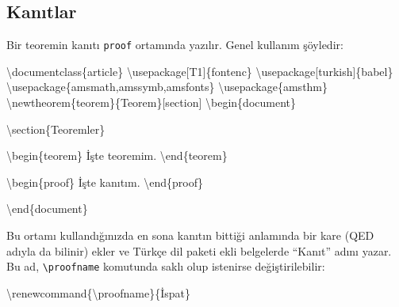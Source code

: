 \documentclass[
  letterpaper,
  DIV=11,
  numbers=noendperiod]{scrreprt}
\newenvironment{Shaded}{\begin{snugshade}}{\end{snugshade}}
\newcommand{\BuiltInTok}[1]{\textcolor[rgb]{0.00,0.23,0.31}{#1}}
\newcommand{\ExtensionTok}[1]{\textcolor[rgb]{0.00,0.23,0.31}{#1}}
\newcommand{\FunctionTok}[1]{\textcolor[rgb]{0.28,0.35,0.67}{#1}}
\newcommand{\KeywordTok}[1]{\textcolor[rgb]{0.00,0.23,0.31}{#1}}
\newcommand{\NormalTok}[1]{\textcolor[rgb]{0.00,0.23,0.31}{#1}}
\begin{document}
\hypertarget{kanux131tlar}{%
\subsection{Kanıtlar}\label{kanux131tlar}}

Bir teoremin kanıtı \texttt{proof} ortamında yazılır. Genel kullanım
şöyledir:

\begin{Shaded}
\begin{Highlighting}[]
\BuiltInTok{\textbackslash{}documentclass}\NormalTok{\{}\ExtensionTok{article}\NormalTok{\}}
\BuiltInTok{\textbackslash{}usepackage}\NormalTok{[T1]\{}\ExtensionTok{fontenc}\NormalTok{\}}
\BuiltInTok{\textbackslash{}usepackage}\NormalTok{[turkish]\{}\ExtensionTok{babel}\NormalTok{\}}
\BuiltInTok{\textbackslash{}usepackage}\NormalTok{\{}\ExtensionTok{amsmath,amssymb,amsfonts}\NormalTok{\}}
\BuiltInTok{\textbackslash{}usepackage}\NormalTok{\{}\ExtensionTok{amsthm}\NormalTok{\}}
\FunctionTok{\textbackslash{}newtheorem}\NormalTok{\{teorem\}\{Teorem\}[section]}
\KeywordTok{\textbackslash{}begin}\NormalTok{\{}\ExtensionTok{document}\NormalTok{\}}

\KeywordTok{\textbackslash{}section}\NormalTok{\{Teoremler\}}

\KeywordTok{\textbackslash{}begin}\NormalTok{\{}\ExtensionTok{teorem}\NormalTok{\}}
\NormalTok{ İşte teoremim.}
\KeywordTok{\textbackslash{}end}\NormalTok{\{}\ExtensionTok{teorem}\NormalTok{\}}

\KeywordTok{\textbackslash{}begin}\NormalTok{\{}\ExtensionTok{proof}\NormalTok{\}}
\NormalTok{ İşte kanıtım.}
\KeywordTok{\textbackslash{}end}\NormalTok{\{}\ExtensionTok{proof}\NormalTok{\}}

\KeywordTok{\textbackslash{}end}\NormalTok{\{}\ExtensionTok{document}\NormalTok{\}}
\end{Highlighting}
\end{Shaded}

Bu ortamı kullandığınızda en sona kanıtın bittiği anlamında bir kare
(QED adıyla da bilinir) ekler ve Türkçe dil paketi ekli belgelerde
``Kanıt'' adını yazar. Bu ad, \texttt{\textbackslash{}proofname}
komutunda saklı olup istenirse değiştirilebilir:

\begin{Shaded}
\begin{Highlighting}[]
\FunctionTok{\textbackslash{}renewcommand}\NormalTok{\{}\ExtensionTok{\textbackslash{}proofname}\NormalTok{\}\{İspat\}}
\end{Highlighting}
\end{Shaded}
\end{document}

